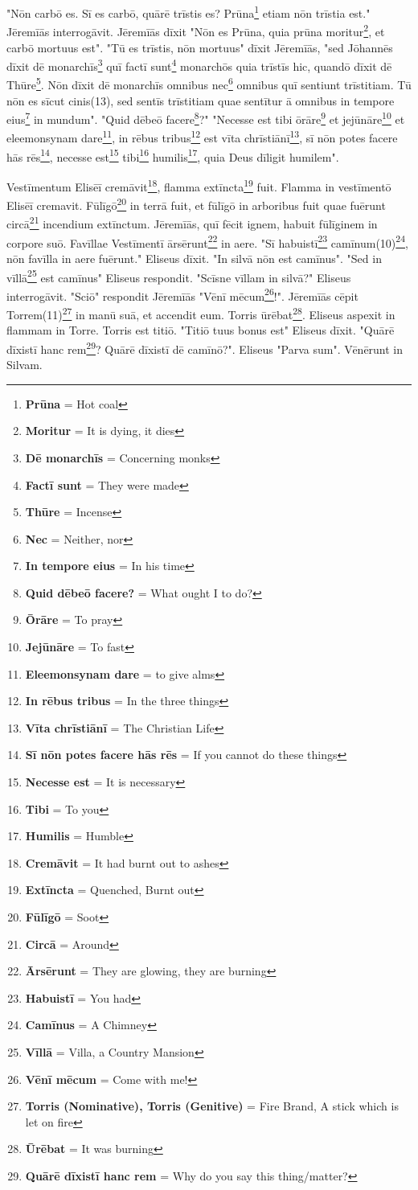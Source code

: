 "Nōn carbō es. Sī es carbō, quārē trīstis es? Prūna\footnote{\textbf{Prūna} = Hot coal} etiam nōn trīstia est." Jēremīās interrogāvit. Jēremīās dīxit "Nōn es Prūna, quia prūna moritur\footnote{\textbf{Moritur} = It is dying, it dies}, et carbō mortuus est". "Tū es trīstis, nōn mortuus" dīxit Jēremīās, "sed Jōhannēs dīxit dē monarchīs\footnote{\textbf{Dē monarchīs} = Concerning monks} quī factī sunt\footnote{\textbf{Factī sunt} = They were made} monarchōs quia trīstīs hic, quandō dīxit dē Thūre\footnote{\textbf{Thūre} = Incense}. Nōn dīxit dē monarchīs omnibus nec\footnote{\textbf{Nec} = Neither, nor} omnibus quī sentiunt trīstitiam. Tū nōn es sīcut cinis(13), sed sentīs trīstitiam quae sentītur ā omnibus in tempore eius\footnote{\textbf{In tempore eius} = In his time} in mundum". "Quid dēbeō facere\footnote{\textbf{Quid dēbeō facere?} = What ought I to do?}?" "Necesse est tibi ōrāre\footnote{\textbf{Ōrāre} = To pray} et jejūnāre\footnote{\textbf{Jejūnāre} = To fast} et eleemonsynam dare\footnote{\textbf{Eleemonsynam dare} = to give alms}, in rēbus tribus\footnote{\textbf{In rēbus tribus} = In the three things} est vīta chrīstiānī\footnote{\textbf{Vīta chrīstiānī} = The Christian Life}, sī nōn potes facere hās rēs\footnote{\textbf{Sī nōn potes facere hās rēs} = If you cannot do these things}, necesse est\footnote{\textbf{Necesse est} = It is necessary} tibi\footnote{\textbf{Tibi} = To you} humilis\footnote{\textbf{Humilis} = Humble}, quia Deus dīligit humilem".\par 
Vestīmentum Elisēī cremāvit\footnote{\textbf{Cremāvit} = It had burnt out to ashes}, flamma extīncta\footnote{\textbf{Extīncta} = Quenched, Burnt out} fuit. Flamma in vestīmentō Elisēī cremavit. Fūlīgō\footnote{\textbf{Fūlīgō} = Soot} in terrā fuit, et fūlīgō in arboribus fuit quae fuērunt circā\footnote{\textbf{Circā} = Around} incendium extīnctum. Jēremīās, quī fēcit ignem, habuit fūlīginem in corpore suō. Favīllae Vestīmentī ārsērunt\footnote{\textbf{Ārsērunt} = They are glowing, they are burning} in aere. "Sī habuistī\footnote{\textbf{Habuistī} = You had} camīnum(10)\footnote{\textbf{Camīnus} = A Chimney}, nōn favīlla in aere fuērunt." Eliseus dīxit. "In silvā nōn est camīnus". "Sed in vīllā\footnote{\textbf{Vīllā} = Villa, a Country Mansion} est camīnus" Eliseus respondit. "Scīsne vīllam in silvā?" Eliseus interrogāvit. "Sciō" respondit Jēremīās "Vēnī mēcum\footnote{\textbf{Vēnī mēcum} = Come with me!}!". Jēremīās cēpit Torrem(11)\footnote{\textbf{Torris (Nominative), Torris (Genitive)} = Fire Brand, A stick which is let on fire} in manū suā, et accendit eum. Torris ūrēbat\footnote{\textbf{Ūrēbat} = It was burning}. Eliseus aspexit in flammam in Torre. Torris est titiō. "Titiō tuus bonus est" Eliseus dīxit. "Quārē dīxistī hanc rem\footnote{\textbf{Quārē dīxistī hanc rem} = Why do you say this thing/matter?}? Quārē dīxistī dē camīnō?". Eliseus "Parva sum". Vēnērunt in Silvam. 

